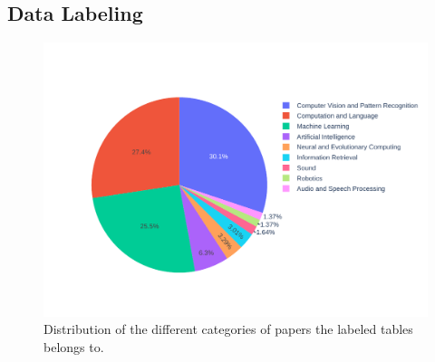 \subsection{Data Labeling}
\label{table_classification:data-coll:lab}
\begin{figure}[h]
    \centering
    \includegraphics[width=\maxwidth{\textwidth}]{src/images/labeled_data_distribution.pdf}
    \caption{Distribution of the different categories of papers the labeled tables belongs to.}
    \label{figure\arabic{figurecounter}}
\end{figure}

